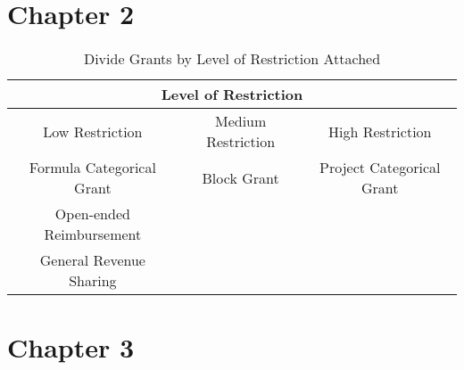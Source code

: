 
\clearpage







\section{Chapter 2}
\begin{table}[H]
    \centering
    \caption{Divide Grants by Level of Restriction Attached}
    \begin{tabular}{ccc}
        \toprule
        \multicolumn{3}{c}{Level of Restriction}                                   \\
        \midrule
        Low Restriction           & Medium Restriction & High Restriction          \\
        \midrule
        Formula Categorical Grant & Block Grant        & Project Categorical Grant \\
        Open-ended Reimbursement  &                    &                           \\
        General Revenue Sharing   &                    &                           \\
        \bottomrule
    \end{tabular}%
    \label{Table 1.3}%
\end{table}%

\clearpage

\section{Chapter 3}


